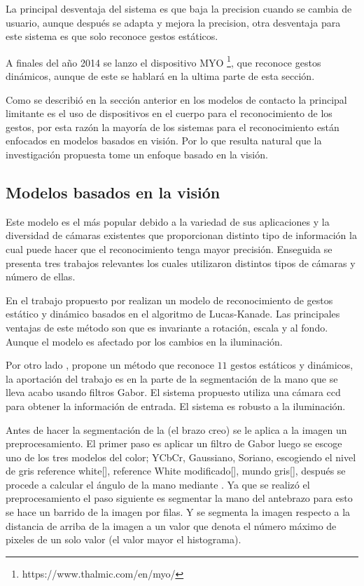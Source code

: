 La principal desventaja del sistema es que baja la precision cuando se cambia de usuario, aunque después se adapta y mejora la precision, otra desventaja para este sistema es que solo reconoce gestos estáticos. 

A finales del año 2014 se lanzo el dispositivo MYO \footnote{https://www.thalmic.com/en/myo/}, que reconoce gestos dinámicos, aunque de este se hablar\'a en la ultima parte de esta sección. 

Como se describi\'o en la sección anterior en los modelos de contacto la principal limitante es el uso de dispositivos en el cuerpo para el reconocimiento de los gestos, por esta razón la mayor\'ia de los sistemas para el reconocimiento están enfocados en modelos basados en visión. Por lo que resulta natural que la investigación propuesta tome un enfoque basado en la visión.

\subsection{Modelos basados en la visión}   

Este modelo es el más popular debido a la variedad de sus aplicaciones y la diversidad de cámaras existentes que proporcionan distinto tipo de información la cual puede hacer que el reconocimiento tenga mayor precisión. Enseguida se presenta tres  trabajos relevantes los cuales utilizaron distintos tipos de cámaras y número de ellas. 

En el trabajo propuesto por \cite{Premaratne2013} realizan un modelo de reconocimiento de gestos estático y dinámico basados en el algoritmo de Lucas-Kanade. Las principales ventajas de este método son que es invariante a rotación, escala y al fondo. Aunque el modelo es afectado por los cambios en la iluminación.


Por otro lado \citep{Huang2011}, propone un método que reconoce $11$ gestos estáticos y dinámicos,  la aportación del trabajo es en la parte de la segmentación de la mano que se lleva acabo usando filtros Gabor. El sistema propuesto utiliza una cámara ccd para obtener la información de entrada. El sistema es robusto a la iluminación. 
 
Antes de hacer la segmentación de la (el brazo creo) se le aplica a la imagen un preprocesamiento. El primer paso es aplicar un filtro de Gabor luego  se escoge uno de los tres modelos del color; YCbCr, Gaussiano, Soriano, escogiendo el nivel de gris reference white[], reference White modificado[], mundo gris[], después se procede a calcular el ángulo de la mano mediante .  
Ya que se realizó el preprocesamiento el paso siguiente es segmentar la mano del antebrazo para esto se hace un barrido de la imagen por filas. Y se segmenta la imagen respecto a la distancia de arriba de la imagen a un valor que denota el número máximo de pixeles de un solo valor (el valor mayor el histograma).

